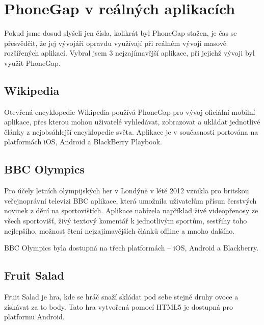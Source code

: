 \section{PhoneGap v reálných aplikacích}
Pokud jsme dosud slyšeli jen čísla, kolikrát byl PhoneGap stažen, je čas se přesvědčit, že jej vývojáři opravdu využívají při reálném vývoji masově rozšířených aplikací. Vybral jsem 3 nejzajímavější aplikace, při jejichž vývoji byl využit PhoneGap.

\subsection{Wikipedia}
Otevřená encyklopedie Wikipedia používá PhoneGap pro vývoj oficiální mobilní aplikace, přes kterou mohou uživatelé vyhledávat, zobrazovat a ukládat jednotlivé články z nejobsáhlejší encyklopedie světa. Aplikace je v současnosti portována na platformách iOS, Android a BlackBerry Playbook.


\subsection{BBC Olympics}
Pro účely letních olympijských her v Londýně v létě 2012 vznikla pro britskou veřejnoprávní televizi BBC aplikace, která umožnila uživatelům přísun čerstvých novinek z dění na sportovištích. Aplikace nabízela například živé videopřenosy ze všech sportovišť, živý textový komentář k jednotlivým sportům, sestřihy toho nejlepšího, možnost čtení nejzajímavějších článků offline a mnoho dalšího. \cite{phonegap_bbc_olympics_app}

BBC Olympics byla dostupná na třech platformách – iOS, Android a Blackberry.


\subsection{Fruit Salad}
Fruit Salad je hra, kde se hráč snaží skládat pod sebe stejné druhy ovoce a získávat za to body. Tato hra vytvořená pomocí HTML5 je dostupná pro platformu Android.


